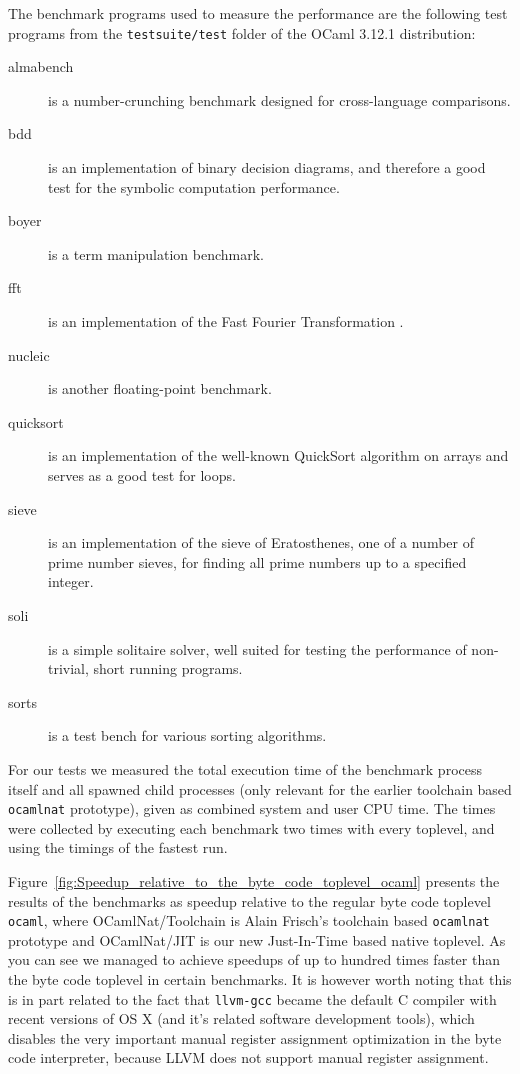 \documentclass[10pt,a4paper,final,twocolumn]{article}
\begin{document}
The benchmark programs used to measure the performance are the following test programs
from the \texttt{testsuite/test} folder of the OCaml 3.12.1 distribution:
\begin{description}
\item[almabench] is a number-crunching benchmark designed for cross-language comparisons.
\item[bdd] is an implementation of binary decision diagrams, and therefore a good test for
  the symbolic computation performance.
\item[boyer] is a term manipulation benchmark.
\item[fft] is an implementation of the Fast Fourier Transformation \cite{BrighamM67}.
\item[nucleic] is another floating-point benchmark.
\item[quicksort] is an implementation of the well-known QuickSort algorithm \cite{Hoare61b,Hoare62}
  on arrays and serves as a good test for loops.
\item[sieve] is an implementation of the sieve of Eratosthenes, one of a number of prime number sieves,
  for finding all prime numbers up to a specified integer.
\item[soli] is a simple solitaire solver, well suited for testing the performance of non-trivial,
  short running programs.
\item[sorts] is a test bench for various sorting algorithms.
\end{description}

For our tests we measured the total execution time of the benchmark process itself and all spawned
child processes (only relevant for the earlier toolchain based \texttt{ocamlnat} prototype), given
as combined system and user CPU time. The times were collected by executing each benchmark two times
with every toplevel, and using the timings of the fastest run.

Figure~\ref{fig:Speedup_relative_to_the_byte_code_toplevel_ocaml} presents the results of the benchmarks
as speedup relative to the regular byte code toplevel \texttt{ocaml}, where OCamlNat/Toolchain is
Alain Frisch's toolchain based \texttt{ocamlnat} prototype and OCamlNat/JIT is our new Just-In-Time based
native toplevel. As you can see we managed to achieve speedups of up to hundred times faster than the
byte code toplevel in certain benchmarks. It is however worth noting that this is in part related to
the fact that \texttt{llvm-gcc} became the default C compiler with recent versions of OS X (and it's
related software development tools), which disables the very important manual register assignment
optimization in the byte code interpreter, because LLVM does not support manual register assignment.
\end{document}
